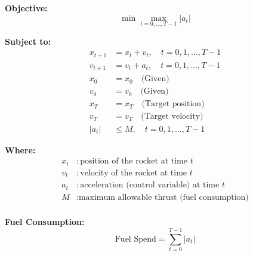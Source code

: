 \documentclass{article}
\begin{document}
\textbf{Objective:}
\[
\min \max_{t=0, \ldots, T-1} |a_t|
\]

\textbf{Subject to:}
\begin{align*}
x_{t+1} &= x_t + v_t, \quad t = 0, 1, \ldots, T-1 \\
v_{t+1} &= v_t + a_t, \quad t = 0, 1, \ldots, T-1 \\
x_0 &= x_0 \quad \text{(Given)} \\
v_0 &= v_0 \quad \text{(Given)} \\
x_T &= x_T \quad \text{(Target position)} \\
v_T &= v_T \quad \text{(Target velocity)} \\
|a_t| &\leq M, \quad t = 0, 1, \ldots, T-1
\end{align*}

\textbf{Where:}
\begin{align*}
x_t &: \text{position of the rocket at time } t \\
v_t &: \text{velocity of the rocket at time } t \\
a_t &: \text{acceleration (control variable) at time } t \\
M &: \text{maximum allowable thrust (fuel consumption)} \\
\end{align*}

\textbf{Fuel Consumption:}
\[
\text{Fuel Spend} = \sum_{t=0}^{T-1} |a_t|
\]
\end{document}
